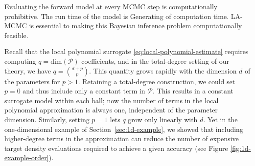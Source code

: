 Evaluating the forward model at every MCMC step is computationally prohibitive. The run time of the model is  Generating  
of computation time. LA-MCMC is essential to making this Bayesian inference problem computationally feasible. 


Recall that the local polynomial surrogate \eqref{eq:local-polynomial-estimate} requires computing $q = \text{dim}(\mathcal{P})$ coefficients, and in the total-degree setting of our theory, we have $q = {{d+p}\choose{p}}$. This quantity grows rapidly with the dimension $d$ of the parameters for $p>1$.
Retaining a total-degree construction, we could set $p=0$ and thus include only a constant term in $\mathcal{P}$. This results in a constant surrogate model within each ball; now the number of terms in the local polynomial approximation is always one, independent of the parameter dimension. Similarly, setting $p=1$ lets $q$ grow only linearly with $d$. Yet in the one-dimensional example of Section~\ref{sec:1d-example}, we showed that including higher-degree terms in the approximation can reduce the number of expensive target density evaluations required to achieve a given accuracy (see Figure \ref{fig:1d-example-order}).

